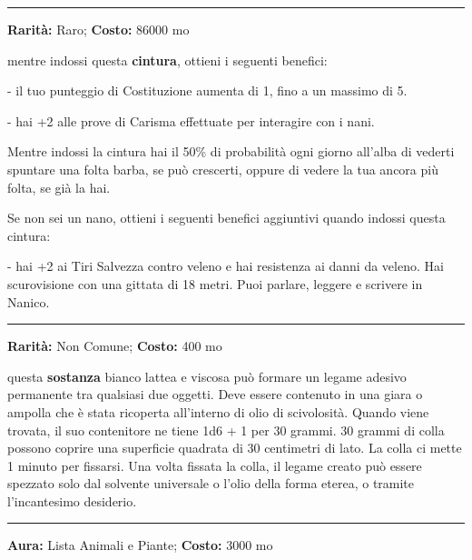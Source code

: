 \begin{multicols}{2}
\smallskip\noindent\rule{\linewidth}{2pt}  \hypertarget{CinturadeiNani}{}\medskip{}\noindent\label{CinturadeiNani}

\textbf{Rarità:} Raro; \textbf{Costo:} 86000 mo

mentre indossi questa \textbf{cintura}, ottieni i seguenti benefici:

- il tuo punteggio di Costituzione aumenta di 1, fino a un massimo di 5.

- hai +2 alle prove di Carisma effettuate per interagire con i nani.

Mentre indossi la cintura hai il 50\% di probabilità ogni giorno all'alba di vederti spuntare una folta barba, se può crescerti, oppure di vedere la tua ancora più folta, se già la hai.

Se non sei un nano, ottieni i seguenti benefici aggiuntivi quando indossi questa cintura:

- hai +2 ai Tiri Salvezza contro veleno e hai resistenza ai danni da veleno. Hai scurovisione con una gittata di 18 metri. Puoi parlare, leggere e scrivere in Nanico.

\smallskip\noindent\rule{\linewidth}{2pt}  \hypertarget{CollaSuprema}{}\medskip{}\noindent\label{CollaSuprema}

\textbf{Rarità:} Non Comune; \textbf{Costo:} 400 mo

questa \textbf{sostanza} bianco lattea e viscosa può formare un legame adesivo permanente tra qualsiasi due oggetti. Deve essere contenuto in una giara o ampolla che è stata ricoperta all'interno di olio di scivolosità. Quando viene trovata, il suo contenitore ne tiene 1d6 + 1 per 30 grammi. 30 grammi di colla possono coprire una superficie quadrata di 30 centimetri di lato. La colla ci mette 1 minuto per fissarsi. Una volta fissata la colla, il legame creato può essere spezzato solo dal solvente universale o l'olio della forma eterea, o tramite l'incantesimo desiderio.

\smallskip\noindent\rule{\linewidth}{2pt}  \hypertarget{CollanadelRosario}{}\medskip{}\noindent\label{CollanadelRosario}

\textbf{Aura:} Lista Animali e Piante; \textbf{Costo:} 3000 mo


\end{multicols}
